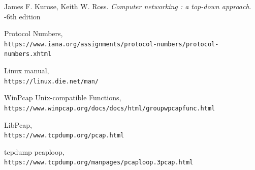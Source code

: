 \documentclass{article}
\begin{document}
\begin{thebibliography}{9}
James F. Kurose, Keith W. Ross. 
\textit{Computer networking : a top-down approach}. 
-6th edition

Protocol Numbers,
\\\texttt{https://www.iana.org/assignments/protocol-numbers/protocol-numbers.xhtml}

Linux manual,
\\\texttt{https://linux.die.net/man/}

WinPcap Unix-compatible Functions,
\\\texttt{https://www.winpcap.org/docs/docs/html/group\textunderscore \textunderscore wpcapfunc.html}

LibPcap,
\\\texttt{https://www.tcpdump.org/pcap.html}

tcpdump pcap\textunderscore loop,
\\\texttt{https://www.tcpdump.org/manpages/pcap\textunderscore loop.3pcap.html}


\end{thebibliography}

	
\end{document}
